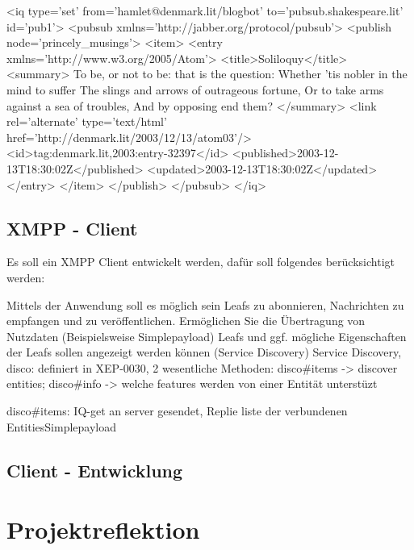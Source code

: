 \documentclass[a4paper]{article}
\begin{document}
<iq type='set'  
    from='hamlet@denmark.lit/blogbot'  
    to='pubsub.shakespeare.lit'  
    id='pub1'>  
  <pubsub xmlns='http://jabber.org/protocol/pubsub'>  
    <publish node='princely\_musings'>  
      <item>  
        <entry xmlns='http://www.w3.org/2005/Atom'>  
          <title>Soliloquy</title>  
          <summary>  
To be, or not to be: that is the question:  
Whether 'tis nobler in the mind to suffer  
The slings and arrows of outrageous fortune,  
Or to take arms against a sea of troubles,  
And by opposing end them?  
          </summary>  
          <link rel='alternate' type='text/html'  
                href='http://denmark.lit/2003/12/13/atom03'/>  
          <id>tag:denmark.lit,2003:entry-32397</id>  
          <published>2003-12-13T18:30:02Z</published>  
          <updated>2003-12-13T18:30:02Z</updated>  
        </entry>  
      </item>  
    </publish>  
  </pubsub>  
</iq>  


\newpage

\subsection{XMPP - Client}

Es soll ein XMPP Client entwickelt werden, dafür soll folgendes berücksichtigt werden:

Mittels der Anwendung soll es möglich sein Leafs zu abonnieren, Nachrichten zu empfangen und zu veröffentlichen.
Ermöglichen Sie die Übertragung von Nutzdaten (Beispielsweise Simplepayload)
Leafs und ggf. mögliche Eigenschaften der Leafs sollen angezeigt werden können (Service Discovery)
Service Discovery, disco: definiert in XEP-0030, 
2 wesentliche Methoden: disco\#items -> discover entities; disco\#info -> welche features werden von einer Entität unterstüzt

disco\#items: IQ-get an server gesendet, Replie liste der verbundenen EntitiesSimplepayload

\newpage

\subsection{Client - Entwicklung}

\newpage

\section{Projektreflektion}

\newpage

\listoffigures

\newpage 

\listoftables
\end{document}
